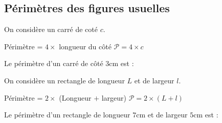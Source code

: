 \documentclass[a4paper,10pt]{report}
\begin{document}
\subsection{Périmètres des figures usuelles}

\begin{prop}
On considère un carré de coté $c$.
\begin{center}
Périmètre = $4 \times$ longueur du côté \quad \quad \quad \quad  $\mathcal{P} = 4 \times c$
\end{center}
\end{prop}

\begin{ex}
Le périmètre d'un carré de côté $3$cm est :

\noindent\grandscarreaux{\linewidth}{1.6cm}
\end{ex}

\begin{prop}
On considère un rectangle de longueur $L$ et de largeur $l$.
\begin{center}
Périmètre = $2 \times$ (Longueur $+$ largeur) \quad \quad \quad \quad $\mathcal{P} = 2 \times( L + l )$
\end{center}
\end{prop}

\begin{ex}
Le périmètre d'un rectangle de longueur $7$cm et de largeur $5$cm est :

\noindent\grandscarreaux{\linewidth}{3.2cm}
\end{ex}
\end{document}

